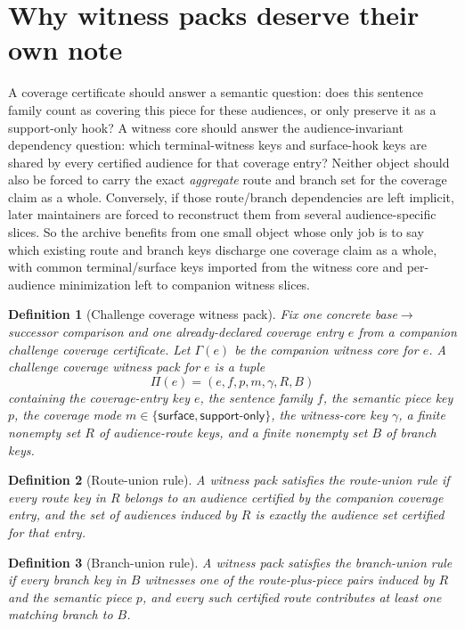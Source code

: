 \documentclass[11pt]{article}
\newtheorem{definition}{Definition}
\begin{document}
\section{Why witness packs deserve their own note}
A coverage certificate should answer a semantic question: does this sentence family count as covering this piece for these audiences, or only preserve it as a support-only hook?
A witness core should answer the audience-invariant dependency question: which terminal-witness keys and surface-hook keys are shared by every certified audience for that coverage entry?
Neither object should also be forced to carry the exact \emph{aggregate} route and branch set for the coverage claim as a whole.
Conversely, if those route/branch dependencies are left implicit, later maintainers are forced to reconstruct them from several audience-specific slices.
So the archive benefits from one small object whose only job is to say which existing route and branch keys discharge one coverage claim as a whole, with common terminal/surface keys imported from the witness core and per-audience minimization left to companion witness slices.

\begin{definition}[Challenge coverage witness pack]
Fix one concrete base$\to$successor comparison and one already-declared coverage entry $e$ from a companion challenge coverage certificate.
Let $\Gamma(e)$ be the companion witness core for $e$.
A \emph{challenge coverage witness pack} for $e$ is a tuple
\[
\Pi(e)=(e,f,p,m,\gamma,R,B)
\]
containing the coverage-entry key $e$, the sentence family $f$, the semantic piece key $p$, the coverage mode $m\in\{\textsf{surface},\textsf{support-only}\}$, the witness-core key $\gamma$, a finite nonempty set $R$ of audience-route keys, and a finite nonempty set $B$ of branch keys.
\end{definition}

\begin{definition}[Route-union rule]
A witness pack satisfies the \emph{route-union rule} if every route key in $R$ belongs to an audience certified by the companion coverage entry, and the set of audiences induced by $R$ is exactly the audience set certified for that entry.
\end{definition}

\begin{definition}[Branch-union rule]
A witness pack satisfies the \emph{branch-union rule} if every branch key in $B$ witnesses one of the route-plus-piece pairs induced by $R$ and the semantic piece $p$, and every such certified route contributes at least one matching branch to $B$.
\end{definition}
\end{document}
